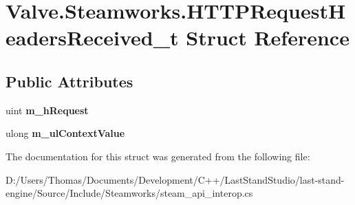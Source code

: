\hypertarget{structValve_1_1Steamworks_1_1HTTPRequestHeadersReceived__t}{}\section{Valve.\+Steamworks.\+H\+T\+T\+P\+Request\+Headers\+Received\+\_\+t Struct Reference}
\label{structValve_1_1Steamworks_1_1HTTPRequestHeadersReceived__t}
\subsection*{Public Attributes}
\begin{DoxyCompactItemize}
\item 
\hypertarget{structValve_1_1Steamworks_1_1HTTPRequestHeadersReceived__t_ae0d65ac06c6a1981f5e9fb889b810ff7}{}uint {\bfseries m\+\_\+h\+Request}\label{structValve_1_1Steamworks_1_1HTTPRequestHeadersReceived__t_ae0d65ac06c6a1981f5e9fb889b810ff7}

\item 
\hypertarget{structValve_1_1Steamworks_1_1HTTPRequestHeadersReceived__t_a1004b418481d354011f7c31b116d2894}{}ulong {\bfseries m\+\_\+ul\+Context\+Value}\label{structValve_1_1Steamworks_1_1HTTPRequestHeadersReceived__t_a1004b418481d354011f7c31b116d2894}

\end{DoxyCompactItemize}


The documentation for this struct was generated from the following file\+:\begin{DoxyCompactItemize}
\item 
D\+:/\+Users/\+Thomas/\+Documents/\+Development/\+C++/\+Last\+Stand\+Studio/last-\/stand-\/engine/\+Source/\+Include/\+Steamworks/steam\+\_\+api\+\_\+interop.\+cs\end{DoxyCompactItemize}

